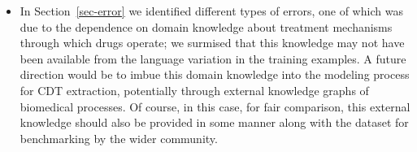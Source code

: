 \documentclass[conference]{IEEEtran}
\begin{document}
\begin{itemize}
\item In Section~\ref{sec-error} we identified different types of errors, one of which was due to the dependence on domain knowledge about treatment mechanisms through which drugs operate; we surmised that this knowledge may not have been available from the language variation in the training examples.  A future direction would be to imbue this domain knowledge into the modeling process for CDT extraction, potentially through external knowledge graphs of biomedical processes. Of course, in this case, for fair comparison, this external knowledge should also be provided in some manner along with the dataset for benchmarking by the wider community. 
\end{itemize}
\newpage


\end{document}
